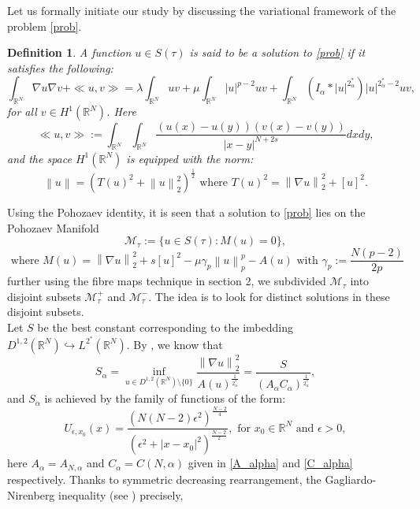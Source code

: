 \documentclass[11pt]{article}
\numberwithin{equation}{section}
\newtheorem{defi}{Definition}[section]
\numberwithin{mytheorem}{section}
\begin{document}
	Let us formally initiate our study by discussing the variational framework of the problem \eqref{prob}.
	\begin{defi}\label{weak_sol}
		A function $u\in S(\tau)$ is said to be a solution to \eqref{prob} if it satisfies the following:
		\begin{equation}\label{sol}
			\int_{\mathbb{R}^N}\nabla u \nabla v +\ll u,v \gg = \lambda\int_{\mathbb{R}^N}uv+ \mu\int_{\mathbb{R}^N}|u|^{p-2}uv +\int_{\mathbb{R}^N}(I_{\alpha}*|u|^{2^*_{\alpha}})|u|^{2^*_{\alpha}-2}uv, 
		\end{equation}
		for all $v\in H^1(\mathbb{R}^N)$. Here $$\ll u, v \gg := \int_{\mathbb{R}^N}\int_{\mathbb{R}^N}\frac{(u(x)-u(y))(v(x)-v(y))}{|x-y|^{N+2s}}dxdy,$$
		and the space $H^1(\mathbb{R}^N)$ is equipped with the norm:
		$$\left\| u \right\| = \left(T(u)^2+\left\| u \right\|_2^2\right)^{\frac{1}{2}} \text{ where }T(u)^2=\left\| \nabla u \right\|_2^2+[u]^2.$$
	\end{defi}
	\noindent Using the Pohozaev identity, it is seen that a solution to \eqref{prob} lies on the Pohozaev Manifold 
	$$\mathcal{M}_{\tau}:=\{u\in S(\tau): M(u)=0\},$$ $$\text{ where }M(u)= \left\| \nabla u \right\|_2^2+s[u]^2-\mu\gamma_p\left\| u \right\|_p^p-A(u) \text{ with }\gamma_p:=\frac{N(p-2)}{2p}$$
	further using the fibre maps technique in section 2, we subdivided $\mathcal{M}_{\tau}$ into disjoint subsets $\mathcal{M}_{\tau}^+$ and $\mathcal{M}_{\tau}^-$. The idea is to look for distinct solutions in these disjoint subsets. \\
	Let $S$ be the  best constant corresponding to the imbedding $D^{1,2}(\mathbb{R}^N)\hookrightarrow L^{2^*}(\mathbb{R}^N)$. By \cite{shang2023normalized}, we know that
	\begin{equation}\label{S_alpha}
		S_{\alpha}=\inf_{u\in D^{1,2}(\mathbb{R}^N)\setminus \{0\}}\frac{\left\| \nabla u\right\|_2^2}{A(u)^{\frac{1}{2^*_{\alpha}}}}=\frac{S}{(A_{\alpha}C_{\alpha})^{\frac{1}{2^*_{\alpha}}}},
	\end{equation}
	and $S_{\alpha}$ is achieved by the family of functions of the form:
	\begin{equation}\label{U_epsilon}
		U_{\epsilon,x_0}(x)=\frac{(N(N-2)\epsilon^2)^{\frac{N-2}{4}}}{(\epsilon^2+|x-x_0|^2)^{\frac{N-2}{2}}},\text{ for } x_0\in \mathbb{R}^N \text{ and } \epsilon>0,
	\end{equation}
	here $A_{\alpha}=A_{N,\alpha}$ and $C_{\alpha}=C({N,\alpha})$ given in \eqref{A_alpha} and \eqref{C_alpha} respectively. Thanks to symmetric decreasing rearrangement, the Gagliardo-Nirenberg inequality (see \cite[Theorem 1.1]{Fiorenza2021detailed}) precisely, 
\end{document}
